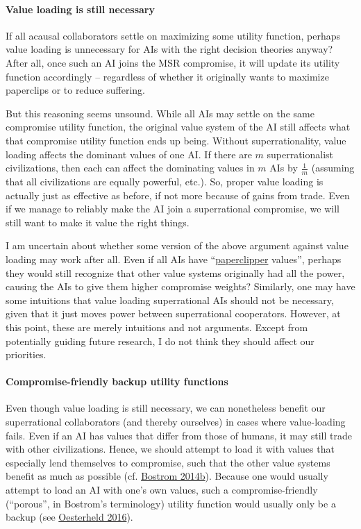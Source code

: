 \paragraph{Value loading is still
necessary}\label{value-loading-is-still-necessary}

If all acausal collaborators settle on maximizing some utility function,
perhaps value loading is unnecessary for AIs with the right decision
theories anyway? After all, once such an AI joins the MSR compromise, it
will update its utility function accordingly -- regardless of whether it
originally wants to maximize paperclips or to reduce suffering.

But this reasoning seems unsound. While all AIs may settle on the same
compromise utility function, the original value system of the AI still
affects what that compromise utility function ends up being. Without
superrationality, value loading affects the dominant values of one AI.
If there are \(m\) superrationalist civilizations, then each can affect
the dominating values in \(m\) AIs by \(\frac{1}{m}\) (assuming that all
civilizations are equally powerful, etc.). So, proper value loading is
actually just as effective as before, if not more because of gains from
trade. Even if we manage to reliably make the AI join a superrational
compromise, we will still want to make it value the right things.

I am uncertain about whether some version of the above argument against
value loading may work after all. Even if all AIs have
``\href{https://wiki.lesswrong.com/wiki/Paperclip_maximizer}{paperclipper}
values'', perhaps they would still recognize that other value systems
originally had all the power, causing the AIs to give them higher
compromise weights? Similarly, one may have some intuitions that value
loading superrational AIs should not be necessary, given that it just
moves power between superrational cooperators. However, at this point,
these are merely intuitions and not arguments. Except from potentially
guiding future research, I do not think they should affect our
priorities.

\hypertarget{compromise-friendly-backup-utility-functions}{\paragraph{Compromise-friendly
backup utility
functions}\label{compromise-friendly-backup-utility-functions}}

Even though value loading is still necessary, we can nonetheless benefit
our superrational collaborators (and thereby ourselves) in cases where
value-loading fails. Even if an AI has values that differ from those of
humans, it may still trade with other civilizations. Hence, we should
attempt to load it with values that especially lend themselves to
compromise, such that the other value systems benefit as much as
possible (cf.
\href{http://www.nickbostrom.com/papers/porosity.pdf}{Bostrom
2014b}). Because one would usually attempt to load an AI with one's own
values, such a compromise-friendly (``porous'', in Bostrom's
terminology) utility function would usually only be a backup (see
\href{https://foundational-research.org/files/backup-utility-functions.pdf}{Oesterheld
2016}).
